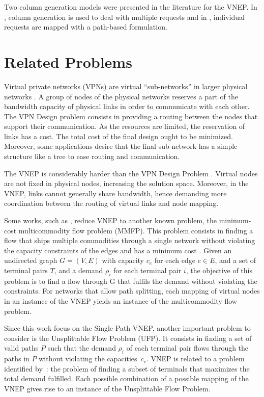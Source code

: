 Two column generation models were presented in the literature for the VNEP. In \cite{Jarray2012}, column generation is used to deal with multiple requests and in \cite{hu:2013}, individual requests are mapped with a path-based formulation.


\section{Related Problems}
\label{sec:relprob}
Virtual private networks (VPNs) are virtual ``sub-networks'' in larger physical networks \cite{Gupta:2001}. A group of nodes of the physical networks reserves a part of the bandwidth capacity of physical links in order to communicate with each other. The VPN Design problem consists in providing a routing between the nodes that support their communication. As the resources are limited, the reservation of links has a cost. The total cost of the final design ought to be minimized. Moreover, some applications desire that the final sub-network has a simple structure like a tree to ease routing and communication. 

The VNEP is considerably harder than the VPN Design Problem \cite{Zhu:2006}. Virtual nodes are not fixed in physical nodes, increasing the solution space. Moreover, in the VNEP, links cannot generally share bandwidth, hence demanding more coordination between the routing of virtual links and node mapping.

Some works, such as \cite{Chowdhury:2012}, reduce VNEP to another known problem, the minimum-cost multicommodity flow problem (MMFP). This problem consists in finding a flow that ships multiple commodities through a single network without violating the capacity constraints of the edges and has a minimum cost \cite{Goldberg1998}. Given an undirected graph $G = (V,E)$ with capacity $c_{e}$ for each edge $e \in E$, and a set of terminal pairs $T$, and a demand $\rho_{i}$ for each terminal pair $i$, the objective of this problem is to find a flow through G that fulfils the demand without violating the constraints. For networks that allow path splitting, each mapping of virtual nodes in an instance of the VNEP yields an instance of the multicommodity flow problem. 

Since this work focus on the Single-Path VNEP, another important problem to consider is the Unsplittable Flow Problem (UFP). It consists in finding a set of valid paths $P$ such that the demand $\rho_{i}$ of each terminal pair flows through the paths in $P$ without violating the capacities~$c_{e}$. 
VNEP is related to a problem identified by~\citet{Kleinberg96}: the problem of finding a subset of terminals that maximizes the total demand fulfilled. Each possible combination of a possible mapping of the VNEP gives rise to an instance of the Unsplittable Flow Problem.

